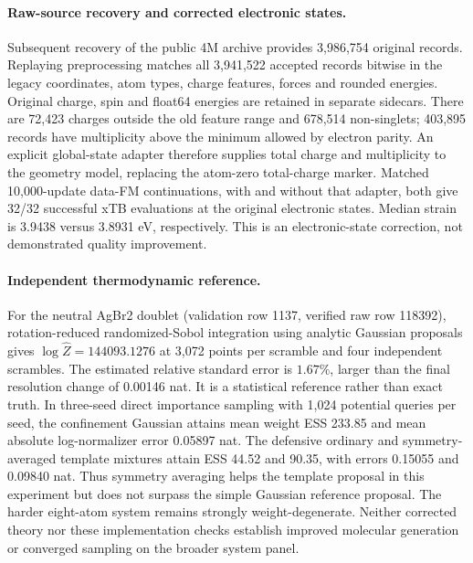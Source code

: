 \paragraph{Raw-source recovery and corrected electronic states.}
Subsequent recovery of the public 4M archive provides 3,986,754 original records.
Replaying preprocessing matches all 3,941,522 accepted records bitwise in the
legacy coordinates, atom types, charge features, forces and rounded energies.
Original charge, spin and float64 energies are retained in separate sidecars.
There are 72,423 charges outside the old feature range and 678,514 non-singlets;
403,895 records have multiplicity above the minimum allowed by electron parity.
An explicit global-state adapter therefore supplies total charge and multiplicity
to the geometry model, replacing the atom-zero total-charge marker.
Matched 10,000-update data-FM continuations, with and without that adapter,
both give 32/32 successful xTB evaluations at the original electronic states.
Median strain is 3.9438 versus 3.8931 eV, respectively.
This is an electronic-state correction, not demonstrated quality improvement.

\paragraph{Independent thermodynamic reference.}
For the neutral AgBr2 doublet (validation row 1137, verified raw row 118392),
rotation-reduced randomized-Sobol integration using analytic Gaussian proposals
gives $\log\widehat Z=144093.1276$ at 3,072 points per scramble and four
independent scrambles. The estimated relative standard error is $1.67\%$,
larger than the final resolution change of 0.00146 nat. It is a statistical
reference rather than exact truth. In three-seed direct importance sampling
with 1,024 potential queries per seed, the confinement Gaussian attains mean
weight ESS 233.85 and mean absolute log-normalizer error 0.05897 nat.
The defensive ordinary and symmetry-averaged template mixtures attain ESS
44.52 and 90.35, with errors 0.15055 and 0.09840 nat. Thus symmetry averaging
helps the template proposal in this experiment but does not surpass the simple
Gaussian reference proposal. The harder eight-atom system remains strongly
weight-degenerate. Neither corrected theory nor these implementation checks
establish improved molecular generation or converged sampling on the broader
system panel.

